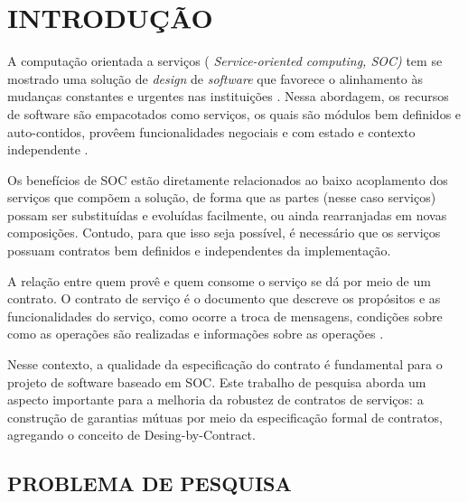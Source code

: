 

\chapter{INTRODUÇÃO}
\vspace{-6mm}

A computação orientada a serviços ( \emph{Service-oriented computing, SOC)} tem
se mostrado uma solução de \textit{design} de \textit{software} que favorece o
alinhamento às mudanças constantes e urgentes nas instituições
\cite{chen2008towards}. Nessa abordagem, os recursos de software são empacotados
como serviços, os quais são módulos bem definidos e auto-contidos, provêem funcionalidades negociais e com estado e
contexto independente \cite{papazoglou2007service}.

Os benefícios de SOC estão diretamente relacionados ao
baixo acoplamento dos serviços que compõem a solução, de forma que as partes
(nesse caso serviços) possam ser substituídas e evoluídas facilmente, ou ainda
rearranjadas em novas composições. Contudo, para que isso seja possível, é
necessário que os serviços possuam contratos bem definidos e independentes da
implementação.

A relação entre quem provê e quem consome o serviço se
dá por meio de um contrato. O contrato de serviço é o documento que descreve os
propósitos e as funcionalidades do serviço, como ocorre a troca de mensagens, condições sobre
como as operações são realizadas e informações sobre as operações \cite{erl2009web}.

Nesse contexto, a qualidade da especificação do contrato é fundamental para o
projeto de software baseado em SOC. Este trabalho de pesquisa aborda um aspecto
importante para a melhoria da robustez de contratos de serviços: a construção de
garantias mútuas por meio da especificação formal de contratos, agregando o
conceito de Desing-by-Contract.

\section{PROBLEMA DE PESQUISA}
\vspace{-6mm}

